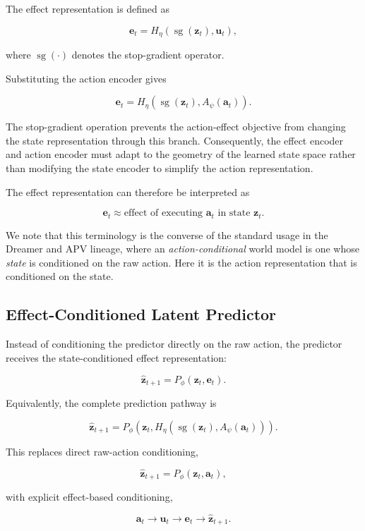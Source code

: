 ﻿\documentclass{article}
\begin{document}
The effect representation is defined as

\[
\mathbf{e}_t
=
H_{\eta}
\left(
\operatorname{sg}(\mathbf{z}_t),
\mathbf{u}_t
\right),
\]

where \(\operatorname{sg}(\cdot)\) denotes the stop-gradient operator.

Substituting the action encoder gives

\[
\mathbf{e}_t
=
H_{\eta}
\left(
\operatorname{sg}(\mathbf{z}_t),
A_{\psi}(\mathbf{a}_t)
\right).
\]

The stop-gradient operation prevents the action-effect objective from
changing the state representation through this branch. Consequently,
the effect encoder and action encoder must adapt to the geometry of the
learned state space rather than modifying the state encoder to simplify
the action representation.

The effect representation can therefore be interpreted as

\[
\mathbf{e}_t
\approx
\text{effect of executing }
\mathbf{a}_t
\text{ in state }
\mathbf{z}_t.
\]

We note that this terminology is the converse of the standard usage in
the Dreamer and APV lineage, where an \emph{action-conditional} world
model is one whose \emph{state} is conditioned on the raw action. Here it
is the action representation that is conditioned on the state.

\subsection{Effect-Conditioned Latent Predictor}

Instead of conditioning the predictor directly on the raw action, the
predictor receives the state-conditioned effect representation:

\[
\hat{\mathbf{z}}_{t+1}
=
P_{\phi}
\left(
\mathbf{z}_t,
\mathbf{e}_t
\right).
\]

Equivalently, the complete prediction pathway is

\[
\hat{\mathbf{z}}_{t+1}
=
P_{\phi}
\left(
\mathbf{z}_t,
H_{\eta}
\left(
\operatorname{sg}(\mathbf{z}_t),
A_{\psi}(\mathbf{a}_t)
\right)
\right).
\]

This replaces direct raw-action conditioning,

\[
\hat{\mathbf{z}}_{t+1}
=
P_{\phi}(\mathbf{z}_t,\mathbf{a}_t),
\]

with explicit effect-based conditioning,

\[
\mathbf{a}_t
\longrightarrow
\mathbf{u}_t
\longrightarrow
\mathbf{e}_t
\longrightarrow
\hat{\mathbf{z}}_{t+1}.
\]
\end{document}
